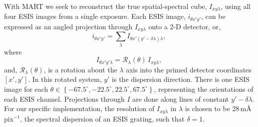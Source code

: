 	
	With MART we seek to reconstruct the true spatial-spectral cube, $I_{xy\lambda}$, using all four ESIS images from a single exposure.
	Each ESIS image, $i_{\theta x'y'}$, can be expressed as an angled projection through $I_{xy\lambda}$ onto a 2-D detector, or,
	\begin{equation}
	    i_{\theta x'y'} = \sum_\lambda I_{\theta x'(y'-\delta\lambda)\lambda},
	\end{equation}
	where
	\begin{equation}
		I_{\theta x'y'\lambda} = \mathcal{R}_\lambda(\theta)\,I_{xy\lambda},
	\end{equation} 
	and, $\mathcal{R}_\lambda (\theta)$, is a rotation about the $\lambda$ axis into the primed detector coordinates $[x',y']$. 
	In this rotated system, $y'$ is the dispersion direction.
	There is one ESIS image for each $\theta \in \left\{ -67.5^{\circ}, -22.5^{\circ}, 22.5^{\circ},67.5^{\circ} \right\}$, representing the  orientations of each ESIS channel.
	Projections through $I$ are done along lines of constant $y'-\delta\lambda$.
	For our specific implementation, the resolution of $I_{xy\lambda}$ in $\lambda$ is chosen to be 28\,m\AA\,pix$^{-1}$, the spectral dispersion of an ESIS grating, such that $\delta = 1$. 

